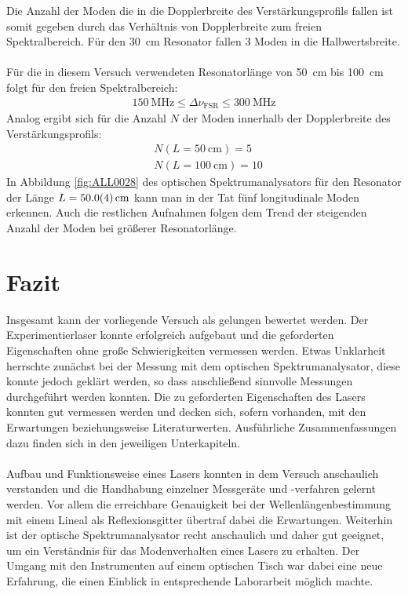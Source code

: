 \documentclass[11pt, a4paper]{article}
\numberwithin{equation}{section}
\begin{document}
Die Anzahl der Moden die in die Dopplerbreite des Verstärkungsprofils fallen ist somit gegeben durch das Verhältnis von Dopplerbreite zum freien Spektralbereich.
Für den \SI{30}{\centi\metre} Resonator fallen \num{3} Moden in die Halbwertsbreite.\\
\\
Für die in diesem Versuch verwendeten Resonatorlänge von \SI{50}{\centi\metre} bis \SI{100}{\centi\metre} folgt für den freien Spektralbereich:
\begin{align}
\SI{150}{\mega\hertz} \le \Delta \nu_\mathrm{FSR} \le \SI{300}{\mega\hertz}
\end{align}
Analog ergibt sich für die Anzahl $N$ der Moden innerhalb der Dopplerbreite des Verstärkungsprofils:
\begin{align}
	&N(L = \SI{50}{\centi\metre}) = 5 \\
	&N(L = \SI{100}{\centi\metre}) = 10
\end{align}
In Abbildung \ref{fig:ALL0028} des optischen Spektrumanalysators für den Resonator der Länge $L = \SI{50 +- 0.4}{\centi\metre}$ kann man in der Tat fünf longitudinale Moden erkennen.
Auch die restlichen Aufnahmen folgen dem Trend der steigenden Anzahl der Moden bei größerer Resonatorlänge.

\section{Fazit}
Insgesamt kann der vorliegende Versuch als gelungen bewertet werden.
Der Experimentierlaser konnte erfolgreich aufgebaut und die geforderten Eigenschaften ohne große Schwierigkeiten vermessen werden.
Etwas Unklarheit herrschte zunächst bei der Messung mit dem optischen Spektrumanalysator, diese konnte jedoch geklärt werden, so dass anschließend sinnvolle Messungen durchgeführt werden konnten.
Die zu geforderten Eigenschaften des Lasers konnten gut vermessen werden und decken sich, sofern vorhanden, mit den Erwartungen beziehungsweise Literaturwerten.
Ausführliche Zusammenfassungen dazu finden sich in den jeweiligen Unterkapiteln.\\
\\
Aufbau und Funktionsweise eines Lasers konnten in dem Versuch anschaulich verstanden und die Handhabung einzelner Messgeräte und -verfahren gelernt werden.
Vor allem die erreichbare Genauigkeit bei der Wellenlängenbestimmung mit einem Lineal als Reflexionsgitter übertraf dabei die Erwartungen.
Weiterhin ist der optische Spektrumanalysator recht anschaulich und daher gut geeignet, um ein Verständnis für das Modenverhalten eines Lasers zu erhalten.
Der Umgang mit den Instrumenten auf einem optischen Tisch war dabei eine neue Erfahrung, die einen Einblick in entsprechende Laborarbeit möglich machte.
\end{document}
